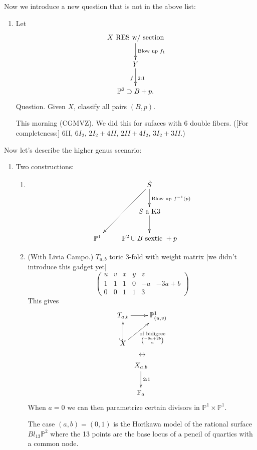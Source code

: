 \noindent
Now we introduce a new question that is not
in the above list:

\begin{enumerate}
\item [(4)] Let
$$
\xymatrix{
X\text{ RES w/ section}
\ar[d]^{\text{Blow up }f_1}\\
Y \ar[d]_f^{2:1}\\
\mathbb{P}^2 \supset B+p.
}
$$
Question. Given $X$,
classify all pairs $(B,p)$.

This morning (CGMVZ).
We did this for sufaces with $6$ double
fibers.
([For completeness:]
6II, 6$I_2$, 2$I_2+4 II$,
$2II+4I_2$,
$3I_2+3II$.)

\end{enumerate}

\noindent
Now let's describe the higher genus scenario:

\begin{enumerate}
\item [(1')]
Two constructions:
\begin{enumerate}
\item
$$
\xymatrix{
&\tilde{S}\ar[d]^{\text{Blow up
}f^{-1}(p)}\ar[ddl]\\
&S \text{ a K3}\ar[d]\\
\mathbb{P}^1 & \mathbb{P}^2 \cup  B \text{
sextic }+p
}
$$

\item (With Livia Campo.)
$T_{a,b}$ toric 3-fold with weight matrix
[we didn't introduce this gadget yet]
$$
\begin{pmatrix}
u&v & x & y & z\\
1& 1 & 1 & 0 & -a & -3a+b\\
0 & 0 & 1 & 1 & 3 \end{pmatrix}
$$
This gives
$$
\xymatrix{
T_{a,b}\ar[r]&\mathbb{P}^1_{(u,v)}\\
X\ar@{^{(}->}[u]\ar[ur]_{\substack{\text{of
bidigree} \\
\binom{-6a+2b}{a}}}
}
$$
$$
\leftrightarrow
$$
$$
\xymatrix{
X_{a,b}\ar[d]^{2:1}\\
\mathbb{F}_a
}
$$
When $a=0$ we can then parametrize
certain divisors in $\mathbb{P}^1 \times
\mathbb{P}^1$.

The case $(a,b)=(0,1)$
is the Horikawa model of the rational surface
$Bl_{13}\mathbb{P}^2$ where
the 13 points are the base locus of a pencil
of quartics
with a common node.
\end{enumerate}
\end{enumerate}

